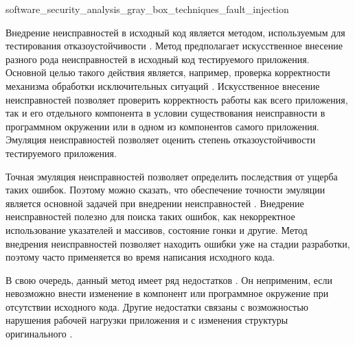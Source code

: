 
	{software_security_analysis_gray_box_techniques_fault_injection}

%
Внедрение неисправностей в исходный код является методом, используемым для тестирования отказоустойчивости  . 
%
Метод предполагает искусственное внесение разного рода неисправностей в исходный код тестируемого приложения. 
%
Основной целью такого действия является, например, проверка корректности механизма обработки исключительных ситуаций . 
%
Искусственное внесение неисправностей позволяет проверить корректность работы как всего приложения, так и его отдельного компонента в условии существования неисправности в программном окружении или в одном из компонентов самого приложения. 
%
Эмуляция неисправностей  позволяет оценить степень отказоустойчивости тестируемого приложения.

%
Точная  эмуляция неисправностей позволяет определить последствия от ущерба таких ошибок. 
%
Поэтому можно сказать, что обеспечение точности эмуляции является основной задачей при внедрении неисправностей . 
%
Внедрение неисправностей полезно для поиска таких ошибок, как некорректное использование указателей и массивов, состояние гонки и другие. 
%
Метод внедрения неисправностей позволяет находить ошибки уже на стадии разработки, поэтому часто применяется  во время написания исходного кода.

%
В свою очередь, данный метод имеет ряд недостатков . 
%
Он неприменим, если невозможно внести изменение в компонент или программное окружение при отсутствии исходного кода. 
%
Другие недостатки связаны с возможностью нарушения рабочей нагрузки приложения и с изменения структуры оригинального .